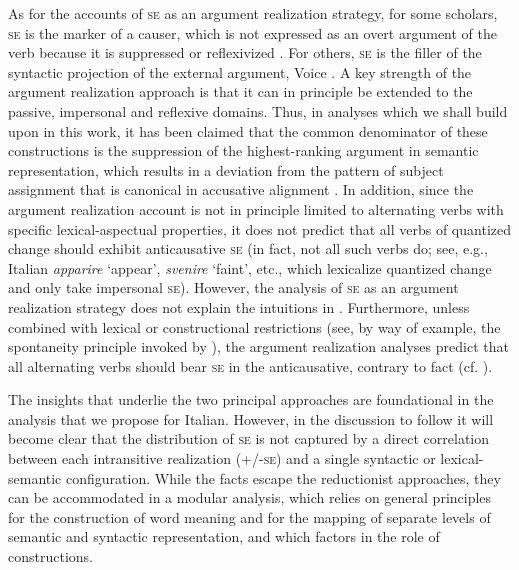 \documentclass[output=paper,colorlinks,citecolor=brown
]{langscibook}
\begin{document}
As for the accounts of \textsc{se} as an argument realization strategy, for some scholars, \textsc{se} is the marker of a causer, which is not expressed as an overt argument of the verb because it is suppressed or reflexivized \citep{rothemerg1974verbes,vanvalin1990semantic,labelle1992change,cennamo1995patterns,centineo1995distribution,bentley2006split,koontz2009anticausativization}. For others, \textsc{se} is the filler of the syntactic projection of the external argument, Voice \citep{alexiadou2006properties,alexiadou2015external}. A key strength of the argument realization approach is that it can in principle be extended to the passive, impersonal and reflexive domains. Thus, in analyses which we shall build upon in this work, it has been claimed that the common denominator of these constructions is the suppression of the highest-ranking argument in semantic representation, which results in a deviation from the pattern of subject assignment that is canonical in accusative alignment \citep{vanvalin1990semantic,centineo1995distribution,bentley2006split,bentley2023internally,gonzales2006construcciones}. In addition, since the argument realization account is not in principle limited to alternating verbs with specific lexical-aspectual properties, it does not predict that all verbs of quantized change should exhibit anticausative \textsc{se} (in fact, not all such verbs do; see, e.g., Italian \textit{apparire} ‘appear’, \textit{svenire} ‘faint’, etc., which lexicalize quantized change and only take impersonal \textsc{se}). However, the analysis of \textsc{se} as an argument realization strategy does not explain the intuitions in . Furthermore, unless combined with lexical or constructional restrictions (see, by way of example, the spontaneity principle invoked by \cite[96, 114--120]{alexiadou2015external}), the argument realization analyses predict that all alternating verbs should bear \textsc{se} in the anticausative, contrary to fact (cf. ). 

The insights that underlie the two principal approaches are foundational in the analysis that we propose for Italian. However, in the discussion to follow it will become clear that the distribution of \textsc{se} is not captured by a direct correlation between each intransitive realization (+/-\textsc{se}) and a single syntactic or lexical-semantic configuration. While the facts escape the reductionist approaches, they can be accommodated in a modular analysis, which relies on general principles for the construction of word meaning and for the mapping of separate levels of semantic and syntactic representation, and which factors in the role of constructions. 
\end{document}
